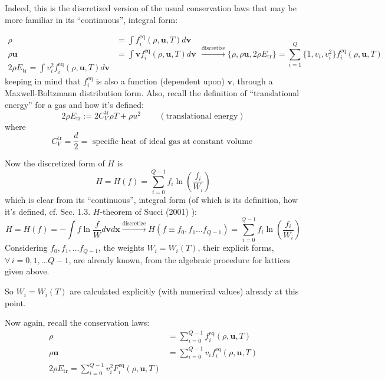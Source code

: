 \documentclass[twoside,landscape,10pt]{amsart}
\theoremstyle{plain}
\theoremstyle{definition}
\theoremstyle{remark}
\theoremstyle{remark}
\begin{document}
\begin{multicols*}{2}
Indeed, this is the discretized version of the usual conservation laws that may be more familiar in its ``continuous'', integral form:

\[
\begin{aligned}
  \rho & = \int f_i^{\text{eq}}(\rho,\mathbf{u},T) d\mathbf{v} \\ 
  \rho \mathbf{u} & = \int \mathbf{v} f_i^{\text{eq}}(\rho,\mathbf{u},T) d\mathbf{v} \\
  2\rho E_{\text{tr}} = \int v_i^2 f_i^{\text{eq}}(\rho,\mathbf{u},T) d\mathbf{v}
  \end{aligned} \xrightarrow{\text{discretize}}   \lbrace \rho, \rho\mathbf{u}, 2\rho E_{\text{tr}} \rbrace = \sum_{i=1}^Q \lbrace 1, v_i, v_i^2 \rbrace f_i^{\text{eq}}(\rho, \mathbf{u}, T)
\]
keeping in mind that $f_i^{\text{eq}}$ is also a function (dependent upon) $\mathbf{v}$, through a Maxwell-Boltzmann distribution form.  Also, recall the definition of ``translational energy'' for a gas and how it's defined:
\begin{equation}
  2\rho E_{\text{tr}} := 2C_V^{\text{tr}} \rho T + \rho u^2 \qquad \, (\text{translational energy})
\end{equation}
where
\begin{equation}
  C_V^{\text{tr}} = \frac{d}{2} = \text{ specific heat of ideal gas at constant volume }
\end{equation}

Now the discretized form of $H$ is
\begin{equation}
  H=H(f) =\sum_{i=0}^{Q-1} f_i \ln{ \left( \frac{f_i}{W_i} \right)}
  \end{equation}
which is clear from its ``continuous'', integral form (of which is its definition, how it's defined, cf. Sec. 1.3. $H$-theorem of Succi (2001) \cite{Succ2001}):
\begin{equation}
  H=H(f) = -\int f \ln{ \frac{f}{W} } d\mathbf{v}d\mathbf{x} \xrightarrow{ \text{discretize} } H(f\equiv f_0,f_1\dots f_{Q-1}) =\sum_{i=0}^{Q-1} f_i \ln{ \left( \frac{f_i}{W_i} \right)}
  \end{equation}
Considering $f_0,f_1,\dots f_{Q-1}$, the weights $W_i = W_i(T)$, their explicit forms, $\forall \, i = 0,1,\dots Q-1$, are already known, from the algebraic procedure for lattices given above.

So $W_i=W_i(T)$ are calculated explicitly (with numerical values) already at this point.

Now again, recall the conservation laws:
\begin{equation}
\begin{aligned}
  \rho & = \sum_{i=0}^{Q-1} f_i^{\text{eq}}(\rho, \mathbf{u},T) \\ 
  \rho \mathbf{u} & = \sum_{i=0}^{Q-1} v_if_i^{\text{eq}}(\rho,\mathbf{u},T) \\ 
  2\rho E_{\text{tr}} = \sum_{i=0}^{Q-1} v_i^2 F_i^{\text{eq}}(\rho, \mathbf{u},T)
    \end{aligned}
  \end{equation}




\end{multicols*}
\end{document}
